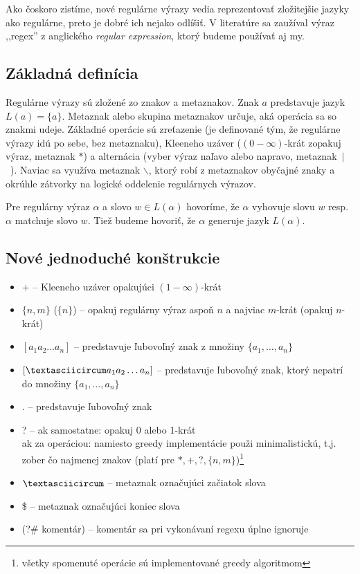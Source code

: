 \documentclass{svk_long_sk}
\begin{document}
Ako čoskoro zistíme, nové regulárne výrazy vedia reprezentovať zložitejšie jazyky ako regulárne, preto je dobré ich nejako odlíšiť. V literatúre sa zaužíval výraz ,,regex'' z anglického \textit{regular expression}, ktorý budeme používať aj my.

\subsection{Základná definícia}

Regulárne výrazy sú zložené zo znakov a metaznakov. Znak $a$ predstavuje jazyk $L(a)=\lbrace a \rbrace$. Metaznak alebo skupina metaznakov určuje, aká operácia sa so znakmi udeje. Základné operácie sú zreťazenie (je definované tým, že regulárne výrazy idú po sebe, bez metaznaku), Kleeneho uzáver ($(0-\infty)$-krát zopakuj výraz, metaznak $*$) a alternácia (vyber výraz naľavo alebo napravo, metaznak~$|$~). Naviac sa využíva metaznak $\backslash$, ktorý robí z metaznakov obyčajné znaky a okrúhle zátvorky na logické oddelenie regulárnych výrazov.

Pre regulárny výraz $\alpha$ a slovo $w\in L(\alpha)$ hovoríme, že $\alpha$ vyhovuje slovu $w$ resp. $\alpha$ matchuje slovo $w$. Tiež budeme hovoriť, že $\alpha$ generuje jazyk $L(\alpha)$.


\subsection{Nové jednoduché konštrukcie}
\begin{itemize}
\item $+$ -- Kleeneho uzáver opakujúci $(1-\infty)$-krát
\item $\lbrace n,m \rbrace$ ($\lbrace n \rbrace$) -- opakuj regulárny výraz aspoň $n$ a najviac $m$-krát (opakuj $n$-krát)
\item $[a_1a_2\dots a_n]$ -- predstavuje ľubovoľný znak z množiny $\lbrace a_1,\dots,a_n \rbrace$
\item $[\textasciicircum a_1a_2\dots a_n]$ -- predstavuje ľubovoľný znak, ktorý nepatrí do množiny $\lbrace a_1,\dots,a_n \rbrace$
\item . -- predstavuje ľubovoľný znak
\item ? -- ak samostatne: opakuj 0 alebo 1-krát \\
ak za operáciou: namiesto greedy implementácie použi minimalistickú, t.j. zober čo najmenej znakov (platí pre $*,+,?,\lbrace n,m \rbrace$)\footnote{všetky spomenuté operácie sú implementované greedy algoritmom}
\item $\textasciicircum$ -- metaznak označujúci začiatok slova
\item \$ -- metaznak označujúci koniec slova
\item (?\# komentár) -- komentár sa pri vykonávaní regexu úplne ignoruje
\end{itemize}
\end{document}
